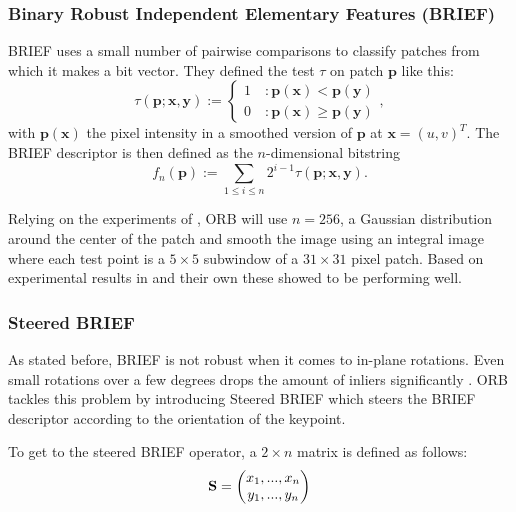 \subsubsection{Binary Robust Independent Elementary Features (BRIEF)}
BRIEF \cite{10.1007/978-3-642-15561-1_56} uses a small number of pairwise comparisons to classify patches from which it makes a bit vector. They defined the test $\tau$ on patch $\boldsymbol{p}$ like this:
\begin{equation}
    \tau(\boldsymbol{p};\boldsymbol{x},\boldsymbol{y}) := \left\{\begin{array}{ll}
         1\quad : \boldsymbol{p}(\boldsymbol{x}) < \boldsymbol{p}(\boldsymbol{y})\\
         0\quad : \boldsymbol{p}(\boldsymbol{x}) \geq \boldsymbol{p}(\boldsymbol{y})
    \end{array} \right.,
\end{equation}
with $\boldsymbol{p}(\boldsymbol{x})$ the pixel intensity in a smoothed version of $\boldsymbol{p}$ at $\boldsymbol{x} = (u, v)^T$. The BRIEF descriptor is then defined as the $n$-dimensional bitstring
\begin{equation}
    f_n(\boldsymbol{p}) := \sum_{1\leq i\leq n} 2^{i-1}\tau(\boldsymbol{p};\boldsymbol{x},\boldsymbol{y}) .
\end{equation}

Relying on the experiments of \cite{10.1007/978-3-642-15561-1_56}, ORB will use $n = 256$, a Gaussian distribution around the center of the patch and smooth the image using an integral image where each test point is a $5 \times 5$ subwindow of a $31 \times 31$ pixel patch. Based on experimental results in \cite{10.1007/978-3-642-15561-1_56} and their own these showed to be performing well.

\subsubsection{Steered BRIEF}
As stated before, BRIEF is not robust when it comes to in-plane rotations. Even small rotations over a few degrees drops the amount of inliers significantly \cite{6126544}. ORB tackles this problem by introducing Steered BRIEF which steers the BRIEF descriptor according to the orientation of the keypoint. \bigskip

To get to the steered BRIEF operator, a $2\times n$ matrix is defined as follows:
\begin{equation}
    \mathbf{S} = \begin{pmatrix}
    x_1,...,x_n \\
    y_1,...,y_n
    \end{pmatrix}
\end{equation}

